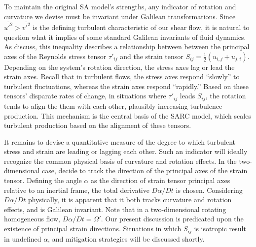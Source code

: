 \documentclass[11pt]{article}
\begin{document}
To maintain the original SA model's strengths, any indicator of rotation and curvature we devise must be invariant under Galilean transformations. Since $\overline{u'^2} > \overline{v'^2}$ is the defining turbulent characteristic of our shear flow, it is natural to question what it implies of some standard Galilean invariants of fluid dynamics. As \citet{spalart1997} discuss, this inequality describes a relationship between between the principal axes of the Reynolds stress tensor $\tau'_{ij}$ and the strain tensor $S_{ij} = \tfrac{1}{2} (u_{i,j} + u_{j,i})$. Depending on the system's rotation direction, the stress axes lag or lead the strain axes. Recall that in turbulent flows, the stress axes respond ``slowly'' to turbulent fluctuations, whereas the strain axes respond ``rapidly.'' Based on these tensors' disparate rates of change, in situations where $\tau'_{ij}$ leads $S_{ij}$, the rotation tends to align the them with each other, plausibly increasing turbulence production. This mechanism is the central basis of the SARC model, which scales turbulent production based on the alignment of these tensors.

It remains to devise a quantitative measure of the degree to which turbulent stress and strain are leading or lagging each other. Such an indicator will ideally recognize the common physical basis of curvature and rotation effects. In the two-dimensional case, \citet{spalart1997} decide to track the direction of the principal axes of the strain tensor. Defining the angle $\alpha$ as the direction of strain tensor principal axes relative to an inertial frame, the total derivative $D \alpha / D t$ is chosen. Considering $D \alpha / D t$ physically, it is apparent that it both tracks curvature and rotation effects, and is Galilean invariant. Note that in a two-dimensional rotating homogeneous flow, $D \alpha / D t = \Omega'$. Our present discussion is predicated upon the existence of principal strain directions. Situations in which $S_{ij}$ is isotropic result in undefined $\alpha$, and mitigation strategies will be discussed shortly.
\end{document}
